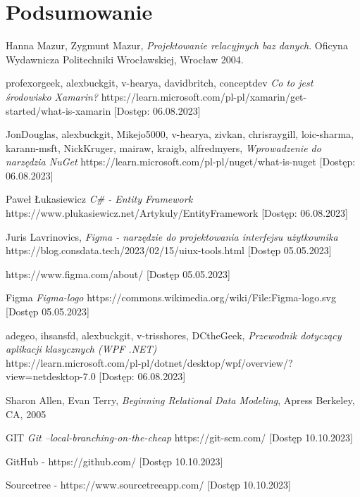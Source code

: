 \documentclass[12pt,oneside]{report}
\begin{document}
\chapter{Podsumowanie}
\begin{thebibliography}{9}
	
	Hanna Mazur, Zygmunt Mazur,
	\emph{Projektowanie relacyjnych baz danych}.
	Oficyna Wydawnicza Politechniki Wrocławskiej, Wrocław 2004.

	 profexorgeek, alexbuckgit, v-hearya, davidbritch, conceptdev \emph{Co to jest środowisko Xamarin?}
	https://learn.microsoft.com/pl-pl/xamarin/get-started/what-is-xamarin [Dostęp: 06.08.2023] 

	 JonDouglas, alexbuckgit, Mikejo5000, v-hearya, zivkan, chrisraygill, loic-sharma, karann-msft, NickKruger,	mairaw, kraigb, alfredmyers, \emph{Wprowadzenie do narzędzia NuGet} https://learn.microsoft.com/pl-pl/nuget/what-is-nuget 
	[Dostęp: 06.08.2023]

	Paweł Łukasiewicz \emph{C\# - Entity Framework} https://www.plukasiewicz.net/Artykuly/EntityFramework
	[Dostęp: 06.08.2023]

	 Juris Lavrinovics, \emph{Figma - narzędzie do projektowania interfejsu użytkownika}
	https://blog.consdata.tech/2023/02/15/uiux-tools.html 
	[Dostęp 05.05.2023]

	https://www.figma.com/about/ 
	[Dostęp 05.05.2023]

	Figma \emph{Figma-logo} https://commons.wikimedia.org/wiki/File:Figma-logo.svg 
	[Dostęp 05.05.2023]
	
	 adegeo, ihsansfd, alexbuckgit, v-trisshores, DCtheGeek, \emph{Przewodnik dotyczący aplikacji klasycznych (WPF .NET)}\\ https://learn.microsoft.com/pl-pl/dotnet/desktop/wpf/overview/?view=netdesktop-7.0 
	[Dostęp: 06.08.2023]
	
	  Sharon Allen, Evan Terry, \emph{Beginning Relational Data Modeling}, Apress Berkeley, CA, 2005
	
	 GIT \emph{Git --local-branching-on-the-cheap} https://git-scm.com/ [Dostęp 10.10.2023]
	
	 GitHub - https://github.com/ [Dostęp 10.10.2023]
	
	 Sourcetree - https://www.sourcetreeapp.com/ [Dostęp 10.10.2023]
	

\end{thebibliography}
\end{document}
